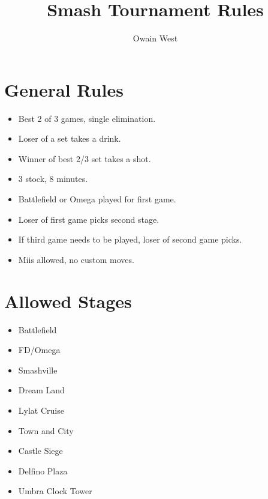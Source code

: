 \usepackage{amsmath}
\usepackage{amsfonts, proof}
\author{Owain West}
\title{Smash Tournament Rules}
\setlength{\parskip}{1em}
\setlength\parindent{0pt}

\section{General Rules}
\begin{itemize}
	\item Best 2 of 3 games, single elimination. 
	\item Loser of a set takes a drink.
	\item Winner of best 2/3 set takes a shot.
	\item 3 stock, 8 minutes.  
	\item Battlefield or Omega played for first game.
	\item Loser of first game picks second stage.
	\item If third game needs to be played, loser of second game picks. 
	\item Miis allowed, no custom moves. 
\end{itemize}
\section{Allowed Stages}
\begin{itemize}
	\item Battlefield
	\item FD/Omega
	\item Smashville
	\item Dream Land
	\item Lylat Cruise
	\item Town and City
	\item Castle Siege
	\item Delfino Plaza
	\item Umbra Clock Tower
\end{itemize}

